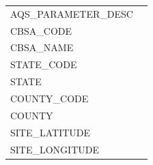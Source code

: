 \documentclass[12pt,]{article}
\begin{document}
\begin{longtable}[]{@{}ll@{}}
\begin{minipage}[t]{0.65\columnwidth}
AQS\_PARAMETER\_DESC\strut
\end{minipage} & \begin{minipage}[t]{0.29\columnwidth}\raggedright
\strut
\end{minipage}\tabularnewline
\begin{minipage}[t]{0.65\columnwidth}\raggedright
CBSA\_CODE\strut
\end{minipage} & \begin{minipage}[t]{0.29\columnwidth}\raggedright
\strut
\end{minipage}\tabularnewline
\begin{minipage}[t]{0.65\columnwidth}\raggedright
CBSA\_NAME\strut
\end{minipage} & \begin{minipage}[t]{0.29\columnwidth}\raggedright
\strut
\end{minipage}\tabularnewline
\begin{minipage}[t]{0.65\columnwidth}\raggedright
STATE\_CODE\strut
\end{minipage} & \begin{minipage}[t]{0.29\columnwidth}\raggedright
\strut
\end{minipage}\tabularnewline
\begin{minipage}[t]{0.65\columnwidth}\raggedright
STATE\strut
\end{minipage} & \begin{minipage}[t]{0.29\columnwidth}\raggedright
\strut
\end{minipage}\tabularnewline
\begin{minipage}[t]{0.65\columnwidth}\raggedright
COUNTY\_CODE\strut
\end{minipage} & \begin{minipage}[t]{0.29\columnwidth}\raggedright
\strut
\end{minipage}\tabularnewline
\begin{minipage}[t]{0.65\columnwidth}\raggedright
COUNTY\strut
\end{minipage} & \begin{minipage}[t]{0.29\columnwidth}\raggedright
\strut
\end{minipage}\tabularnewline
\begin{minipage}[t]{0.65\columnwidth}\raggedright
SITE\_LATITUDE\strut
\end{minipage} & \begin{minipage}[t]{0.29\columnwidth}\raggedright
\strut
\end{minipage}\tabularnewline
\begin{minipage}[t]{0.65\columnwidth}\raggedright
SITE\_LONGITUDE\strut
\end{minipage} & \begin{minipage}[t]{0.29\columnwidth}\raggedright
\strut
\end{minipage}\tabularnewline
\bottomrule
\end{longtable}
\end{document}
